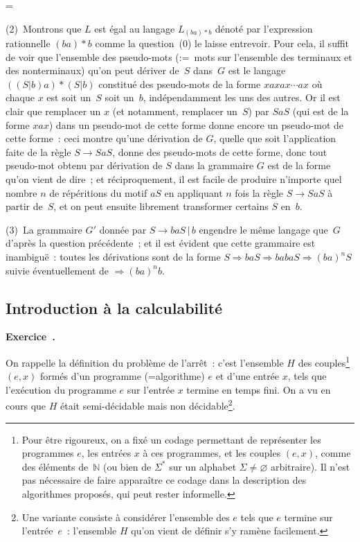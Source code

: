 \documentclass[12pt,a4paper]{article}
\theoremstyle{definition}
\newcommand\exercice{%
\refstepcounter{comcnt}\bigskip\noindent\textbf{Exercice~\thecomcnt.}}
\newif\ifcorrige
\newenvironment{corrige}%
{\ifcorrige\relax\else\setbox0=\vbox\bgroup\fi%
\smallbreak\footnotesize\noindent{\underbar{\textit{Corrigé.}}\quad}}
{{\hbox{}\nobreak\hfill\checkmark}%
\ifcorrige\relax\else\egroup\fi\par}
\begin{document}
\begin{corrige}
\smallbreak

(2) Montrons que $L$ est égal au langage $L_{(ba){*}b}$ dénoté par
l'expression rationnelle $(ba){*}b$ comme la question (0) le laisse
entrevoir.  Pour cela, il suffit de voir que l'ensemble des
pseudo-mots (:= mots sur l'ensemble des terminaux et des nonterminaux)
qu'on peut dériver de $S$ dans $G$ est le langage $((S|b)a){*}(S|b)$
constitué des pseudo-mots de la forme $xaxax\cdots ax$ où chaque $x$
est soit un $S$ soit un $b$, indépendamment les uns des autres.  Or il
est clair que remplacer un $x$ (et notamment, remplacer un $S$) par
$SaS$ (qui est de la forme $xax$) dans un pseudo-mot de cette forme
donne encore un pseudo-mot de cette forme : ceci montre qu'une
dérivation de $G$, quelle que soit l'application faite de la règle
$S\rightarrow SaS$, donne des pseudo-mots de cette forme, donc tout
pseudo-mot obtenu par dérivation de $S$ dans la grammaire $G$ est de
la forme qu'on vient de dire ; et réciproquement, il est facile de
produire n'importe quel nombre $n$ de répéritions du motif $aS$ en
appliquant $n$ fois la règle $S\rightarrow SaS$ à partir de $S$, et on
peut ensuite librement transformer certains $S$ en $b$.

\smallbreak

(3) La grammaire $G'$ donnée par $S \rightarrow baS\,|\,b$ engendre le
même langage que $G$ d'après la question précédente ; et il est
évident que cette grammaire est inambiguë : toutes les dérivations
sont de la forme $S \Rightarrow baS \Rightarrow babaS \Rightarrow
(ba)^n S$ suivie éventuellement de $\Rightarrow (ba)^n b$.
\end{corrige}

%
%
%

\subsection{Introduction à la calculabilité}

\exercice

On rappelle la définition du problème de l'arrêt : c'est l'ensemble
$H$ des couples\footnote{Pour être rigoureux, on a fixé un codage
  permettant de représenter les programmes $e$, les entrées $x$ à ces
  programmes, et les couples $(e,x)$, comme des éléments
  de $\mathbb{N}$ (ou bien de $\Sigma^*$ sur un alphabet
  $\Sigma\neq\varnothing$ arbitraire).  Il n'est pas nécessaire de
  faire apparaître ce codage dans la description des algorithmes
  proposés, qui peut rester informelle.} $(e,x)$ formés d'un programme
(=algorithme) $e$ et d'une entrée $x$, tels que l'exécution du
programme $e$ sur l'entrée $x$ termine en temps fini.  On a vu en
cours que $H$ était semi-décidable mais non décidable\footnote{Une
  variante consiste à considérer l'ensemble des $e$ tels que $e$
  termine sur l'entrée $e$ : l'ensemble $H$ qu'on vient de définir s'y
  ramène facilement.}.
\end{document}
